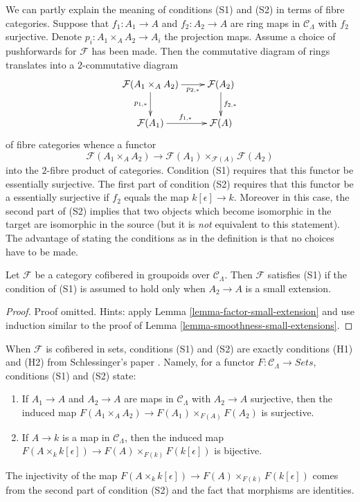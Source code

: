 \noindent
We can partly explain the meaning of conditions (S1) and (S2) in terms of
fibre categories. Suppose that $f_1 : A_1 \to A$ and $f_2 : A_2 \to A$ are
ring maps in $\mathcal{C}_\Lambda$ with $f_2$ surjective.
Denote $p_i : A_1 \times_A A_2 \to A_i$ the projection maps.
Assume a choice of pushforwards for $\mathcal{F}$ has been made.
Then the commutative diagram of rings translates into a $2$-commutative diagram
$$
\xymatrix{
\mathcal{F}(A_1 \times_A A_2) \ar[r]_-{p_{2, *}} \ar[d]_{p_{1, *}} &
\mathcal{F}(A_2) \ar[d]^{f_{2, *}} \\
\mathcal{F}(A_1) \ar[r]^{f_{1, *}} & \mathcal{F}(A)
}
$$
of fibre categories whence a functor
\begin{equation}
\label{equation-compare}
\mathcal{F}(A_1 \times_A A_2) \to
\mathcal{F}(A_1) \times_{\mathcal{F}(A)} \mathcal{F}(A_2)
\end{equation}
into the $2$-fibre product of categories.
Condition (S1) requires that this functor be essentially surjective.
The first part of condition (S2) requires that this functor be a
essentially surjective if $f_2$ equals the map $k[\epsilon] \to k$.
Moreover in this case, the second part of (S2) implies that two objects
which become isomorphic in the target are isomorphic in the source
(but it is {\it not} equivalent to this statement).
The advantage of stating the conditions as in the definition
is that no choices have to be made.

\begin{lemma}
\label{lemma-S1-small-extensions}
Let $\mathcal{F}$ be a category cofibered in groupoids over $\mathcal
C_\Lambda$. Then $\mathcal{F}$ satisfies (S1) if the condition of (S1)
is assumed to hold only when $A_2 \to A$ is a small extension.
\end{lemma}

\begin{proof}
Proof omitted. Hints: apply Lemma \ref{lemma-factor-small-extension}
and use induction similar to the proof of
Lemma \ref{lemma-smoothness-small-extensions}.
\end{proof}

\begin{remark}
\label{remark-compare-S1-S2-schlessinger}
When $\mathcal{F}$ is cofibered in sets, conditions (S1) and (S2) are exactly
conditions (H1) and (H2) from Schlessinger's paper \cite{Sch}.
Namely, for a functor $F: \mathcal{C}_\Lambda \to
\textit{Sets}$, conditions (S1) and (S2) state:
\begin{enumerate}
\item [(S1)] If $A_1 \to A$ and $A_2 \to A$ are maps in
$\mathcal{C}_\Lambda$ with $A_2 \to A$ surjective, then the induced
map $F(A_1 \times_A A_2) \to F(A_1) \times_{F(A)} F(A_2)$ is
surjective.
\item [(S2)]  If $A \to k$ is a map in $\mathcal{C}_\Lambda$, then the
induced map
$F(A \times_k k[\epsilon]) \to F(A) \times_{F(k)} F(k[\epsilon])$
is bijective.
\end{enumerate}
The injectivity of the map
$F(A \times_k k[\epsilon]) \to F(A) \times_{F(k)} F(k[\epsilon])$
comes from the second part of condition (S2) and the fact that morphisms
are identities.
\end{remark}

